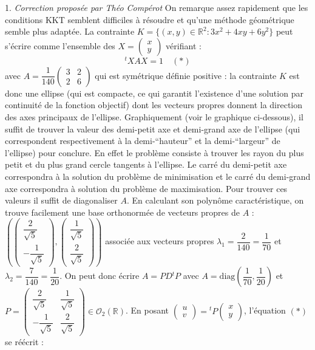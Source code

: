 \documentclass{fancybook}
\begin{document}
1. \hfill \textit{Correction proposée par Théo Compérot}\newline
On remarque assez rapidement que les conditions KKT semblent difficiles à résoudre et qu'une méthode géométrique semble plus adaptée. La contrainte $K = \{ (x,y) \in \mathbb R^2 : 3x^2 + 4xy + 6y^2 \}$ peut s'écrire comme l'ensemble des $X = \begin{pmatrix} x \\ y \end{pmatrix}$ vérifiant :
\[ {}^t\! X A X = 1 \quad (\ast) \]
avec $A = \dfrac{1}{140} \begin{pmatrix} 3 & 2 \\ 2 & 6 \end{pmatrix}$ qui est symétrique définie positive : la contrainte $K$ est donc une ellipse (qui est compacte, ce qui garantit l'existence d'une solution par continuité de la fonction objectif) dont les vecteurs propres donnent la direction des axes principaux de l'ellipse. Graphiquement (voir le graphique ci-dessous), il suffit de trouver la valeur des demi-petit axe et demi-grand axe de l'ellipse (qui correspondent respectivement à la demi-``hauteur'' et la demi-``largeur'' de l'ellipse) pour conclure. En effet le problème consiste à trouver les rayon du plus petit et du plus grand cercle tangents à l'ellipse. Le carré du demi-petit axe correspondra à la solution du problème de minimisation et le carré du demi-grand axe correspondra à solution du problème de maximisation. Pour trouver ces valeurs il suffit de diagonaliser $A$. En calculant son polynôme caractéristique, on trouve facilement une base orthonormée de vecteurs propres de $A$ : $\left(\begin{pmatrix} \dfrac{2}{\sqrt{5}} \\ -\dfrac{1}{\sqrt{5}} \end{pmatrix},\begin{pmatrix} \dfrac{1}{\sqrt{5}} \\ \dfrac{2}{\sqrt{5}} \end{pmatrix}\right)$ associée aux vecteurs propres $\lambda_1 = \dfrac{2}{140} = \dfrac{1}{70}$ et $\lambda_2=\dfrac{7}{140} = \dfrac{1}{20}$. On peut donc écrire $A = PD{}^t\!P$ avec $A = \text{diag}(\dfrac{1}{70},\dfrac{1}{20})$ et $P = \begin{pmatrix} \dfrac{2}{\sqrt{5}} & \dfrac{1}{\sqrt{5}} \\ -\dfrac{1}{\sqrt{5}} & \dfrac{2}{\sqrt{5}} \end{pmatrix} \in \mathcal O_2(\mathbb R)$. En posant $\begin{pmatrix} u \\ v \end{pmatrix} = {}^t\!P \begin{pmatrix} x \\ y \end{pmatrix}$, l'équation $(\ast)$ se réécrit :
\end{document}
